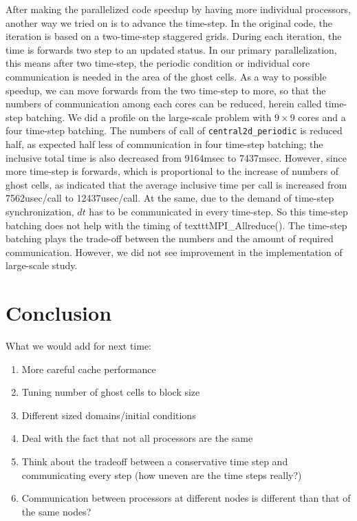 \documentclass{article}
\begin{document}
After making the parallelized code speedup by having more individual processors, another way we tried on is to advance the time-step. In the original code, the iteration is based on a two-time-step staggered grids. During each iteration, the time is forwards two step to an updated status. In our primary parallelization, this means after two time-step, the periodic condition or individual core communication is needed in the area of the ghost cells. As a way to possible speedup, we can move forwards from the two time-step to more, so that the numbers of communication among each cores can be reduced, herein called time-step batching. We did a profile on the large-scale problem with $9\times9$ cores and a four time-step batching. The numbers of call of \texttt{central2d\_periodic} is reduced half, as expected half less of communication in four time-step batching; the inclusive total time is also decreased from 9164msec to 7437msec. However, since more time-step is forwards, which is proportional to the increase of numbers of ghost cells, as indicated that the average inclusive time per call is increased from 7562usec/call to 12437usec/call. At the same, due to the demand of time-step synchronization, $dt$ has to be communicated in every time-step. So this time-step batching does not help with the timing of texttt{MPI\_Allreduce()}. The time-step batching plays the trade-off between the numbers and the amount of required communication. However, we did not see improvement in the implementation of large-scale study.



\section{Conclusion}
What we would add for next time:
\begin{enumerate}
	\item More careful cache performance
	\item Tuning number of ghost cells to block size
	\item Different sized domains/initial conditions
	\item Deal with the fact that not all processors are the same
	\item Think about the tradeoff between a conservative time step and communicating every step (how uneven are the time steps really?)
	\item Communication between processors at different nodes is different than that of the same nodes?
\end{enumerate}
\end{document}
